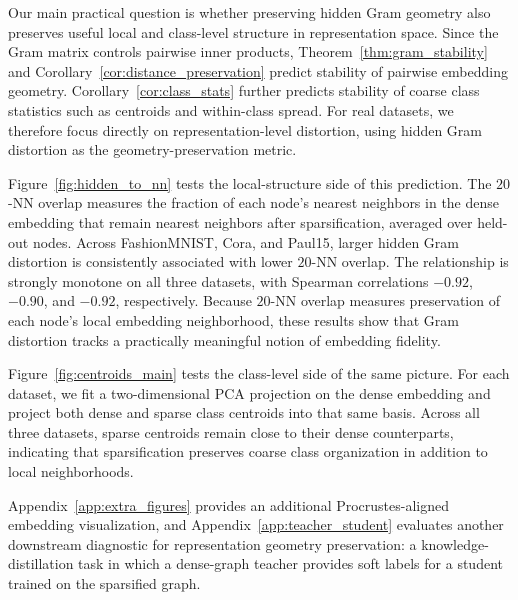 \documentclass{article}
\begin{document}
Our main practical question is whether preserving hidden Gram geometry also preserves useful local and class-level structure in representation space. Since the Gram matrix controls pairwise inner products, Theorem~\ref{thm:gram_stability} and Corollary~\ref{cor:distance_preservation} predict stability of pairwise embedding geometry. Corollary~\ref{cor:class_stats} further predicts stability of coarse class statistics such as centroids and within-class spread. 
For real datasets, we therefore focus directly on representation-level distortion, using
hidden Gram distortion as the geometry-preservation metric.

Figure~\ref{fig:hidden_to_nn} tests the local-structure side of this prediction. The $20$-NN overlap measures the fraction of each node's nearest neighbors in the dense embedding that remain nearest neighbors after sparsification, averaged over held-out nodes. Across FashionMNIST, Cora, and Paul15, larger hidden Gram distortion is consistently associated with lower $20$-NN overlap. The relationship is strongly monotone on all three datasets, with Spearman correlations $-0.92$, $-0.90$, and $-0.92$, respectively. Because $20$-NN overlap measures preservation of each node's local embedding neighborhood, these results show that Gram distortion tracks a practically meaningful notion of embedding fidelity.

Figure~\ref{fig:centroids_main} tests the class-level side of the same picture. For each dataset, we fit a two-dimensional PCA projection on the dense embedding and project both dense and sparse class centroids into that same basis. Across all three datasets, sparse centroids remain close to their dense counterparts, indicating that sparsification preserves coarse class organization in addition to local neighborhoods.


Appendix~\ref{app:extra_figures} provides an additional Procrustes-aligned embedding visualization, and Appendix~\ref{app:teacher_student} evaluates another downstream diagnostic for representation geometry preservation: a knowledge-distillation task in which a dense-graph teacher provides soft labels for a student trained on the sparsified graph.
\end{document}
